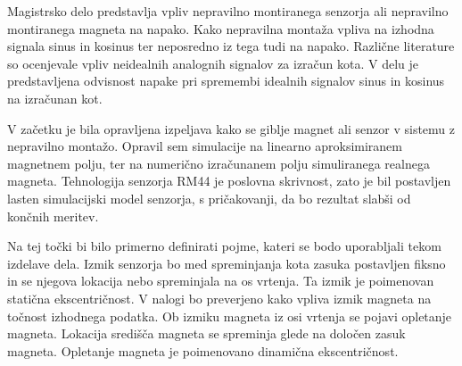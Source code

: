 Magistrsko delo predstavlja vpliv nepravilno montiranega senzorja ali nepravilno montiranega magneta na napako. Kako nepravilna montaža vpliva na izhodna signala sinus in kosinus ter neposredno iz tega tudi na napako.
Različne literature so ocenjevale vpliv neidealnih analognih signalov za izračun kota\cite{osnova}\cite{RLS1}\cite{RLS2}. V delu je predstavljena odvisnost napake pri spremembi idealnih signalov sinus in kosinus na izračunan kot.

V začetku je bila opravljena  izpeljava kako se giblje magnet ali senzor v sistemu z nepravilno montažo\cite{ursic}. Opravil sem simulacije na linearno aproksimiranem magnetnem polju, ter na numerično izračunanem polju simuliranega realnega magneta.
Tehnologija senzorja RM44 je poslovna skrivnost, zato je bil postavljen lasten simulacijski model senzorja, s pričakovanji, da bo rezultat  slabši od končnih meritev.

Na tej točki bi bilo primerno definirati pojme, kateri se bodo uporabljali tekom izdelave dela.
Izmik senzorja bo med spreminjanja kota zasuka postavljen fiksno in se njegova lokacija nebo spreminjala na os vrtenja. Ta izmik je poimenovan statična ekscentričnost.
V nalogi bo preverjeno kako vpliva izmik magneta na točnost izhodnega podatka. Ob izmiku magneta iz osi vrtenja se pojavi opletanje magneta. Lokacija središča magneta se spreminja glede na določen zasuk magneta. Opletanje magneta je poimenovano dinamična ekscentričnost.














%
%
%
%
%
